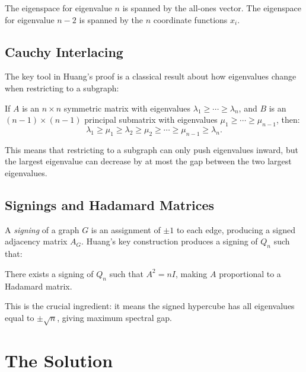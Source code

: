 The eigenspace for eigenvalue $n$ is spanned by the all-ones vector. The eigenspace for eigenvalue $n - 2$ is spanned by the $n$ coordinate functions $x_i$.

\subsection{Cauchy Interlacing}

The key tool in Huang's proof is a classical result about how eigenvalues change when restricting to a subgraph:

\begin{theorem}
If $A$ is an $n \times n$ symmetric matrix with eigenvalues $\lambda_1 \ge \cdots \ge \lambda_n$, and $B$ is an $(n-1) \times (n-1)$ principal submatrix with eigenvalues $\mu_1 \ge \cdots \ge \mu_{n-1}$, then:
\[
\lambda_1 \ge \mu_1 \ge \lambda_2 \ge \mu_2 \ge \cdots \ge \mu_{n-1} \ge \lambda_n.
\]
\end{theorem}

This means that restricting to a subgraph can only push eigenvalues inward, but the largest eigenvalue can decrease by at most the gap between the two largest eigenvalues.

\subsection{Signings and Hadamard Matrices}

A \emph{signing} of a graph $G$ is an assignment of $\pm 1$ to each edge, producing a signed adjacency matrix $A_G$. Huang's key construction produces a signing of $Q_n$ such that:

\begin{fact}
There exists a signing of $Q_n$ such that $A^2 = nI$, making $A$ proportional to a Hadamard matrix.
\end{fact}

This is the crucial ingredient: it means the signed hypercube has all eigenvalues equal to $\pm\sqrt{n}$, giving maximum spectral gap.

\section{The Solution}

